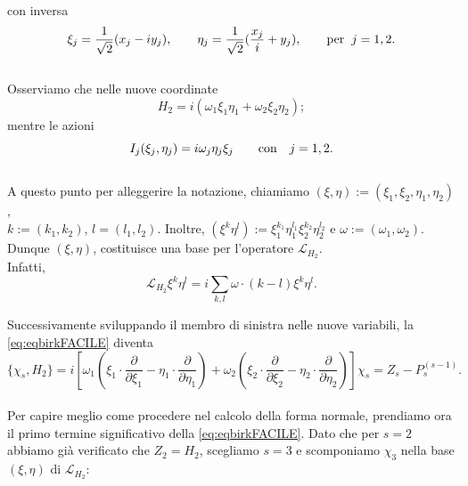 \documentclass[a4paper,11pt,titlepage]{report}
\theoremstyle{definition}
\theoremstyle{plain}
\begin{document}
	\\\\con inversa 
	$$ \xi_j = \frac{1}{\sqrt{2}} (x_j-iy_j), \qquad 
		\eta_j = \frac{1}{\sqrt{2}} (\frac{x_j}{i}+y_j), \qquad \hbox{per} \hspace{2mm} j=1,2. $$
\\Osserviamo che nelle nuove coordinate $$H_2 = i( \omega_1 \xi_1\eta_1+\omega_2\xi_2\eta_2);$$ mentre le azioni $$I_j(\xi_j,\eta_j)=i\omega_j \eta_j \xi_j \qquad \hbox{con} \quad j=1,2.$$ 
\\A questo punto per alleggerire la notazione, chiamiamo $(\xi,\eta):=(\xi_1,\xi_2,\eta_1,\eta_2)$, \\$k:=(k_1,k_2)$, $l=(l_1,l_2)$.
Inoltre, $(\xi^k\eta^l):=\xi_1^{k_1}\eta_1^{l_1}\xi_2^{k_2}\eta_2^{l_2}$ e $\omega:= (\omega_1, \omega_2).$
\\Dunque $(\xi,\eta)$, costituisce una base per l'operatore $\mathcal{L}_{H_2}$. \\Infatti, $$\mathcal{L}_{H_2}\xi^k\eta^l = i \sum_{k,l} \omega \cdot (k-l) \xi^k\eta^l.$$

Successivamente sviluppando il membro di sinistra nelle nuove variabili, la \ref{eq:eqbirkFACILE} diventa
\begin{equation}
	\label{eq:fnBirkcdv}
	\{\chi_s,H_2\} = i[\omega_1( \xi_1 \cdot \frac{\partial}{\partial \xi_1} - \eta_1 \cdot \frac{\partial}{\partial \eta_1}) + 
	\omega_2( \xi_2 \cdot \frac{\partial}{\partial \xi_2} - \eta_2 \cdot \frac{\partial}{\partial \eta_2})] \chi_s = Z_s - P_s^{(s-1)}.
\end{equation}
\\Per capire meglio come procedere nel calcolo della forma normale, prendiamo ora il primo termine significativo della \ref{eq:eqbirkFACILE}. Dato che per $s=2$ abbiamo già verificato che $Z_2=H_2$, scegliamo $s=3$ e scomponiamo $\chi_3$ nella base $(\xi, \eta)$ di $\mathcal{L}_{H_2}$: 
\end{document}

